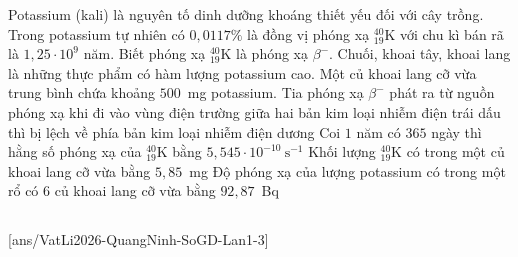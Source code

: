 	\begin{ex}%
		Potassium (kali) là nguyên tố dinh dưỡng khoáng thiết yếu đối với cây trồng. Trong potassium tự nhiên có $0{,}0117\%$ là đồng vị phóng xạ ${}^{40}_{19}\text{K}$ với chu kì bán rã là $1{,}25\cdot 10^9$ năm. Biết phóng xạ ${}^{40}_{19}\text{K}$ là phóng xạ $\beta^-$. Chuối, khoai tây, khoai lang là những thực phẩm có hàm lượng potassium cao. Một củ khoai lang cỡ vừa trung bình chứa khoảng $500$~mg potassium.
		\choiceTFt
		{\True Tia phóng xạ $\beta^-$ phát ra từ nguồn phóng xạ khi đi vào vùng điện trường giữa hai bản kim loại nhiễm điện trái dấu thì bị lệch về phía bản kim loại nhiễm điện dương}
		{Coi $1$ năm có $365$ ngày thì hằng số phóng xạ của ${}^{40}_{19}\text{K}$ bằng $5{,}545\cdot 10^{-10}~\text{s}^{-1}$}
		{Khối lượng ${}^{40}_{19}\text{K}$ có trong một củ khoai lang cỡ vừa bằng $5{,}85$~mg}
		{\True Độ phóng xạ của lượng potassium có trong một rổ có $6$ củ khoai lang cỡ vừa bằng $92{,}87$~Bq}
	\end{ex}

	\subsection*{}
	\setcounter{ex}{0}
	[ans/VatLi2026-QuangNinh-SoGD-Lan1-3]

